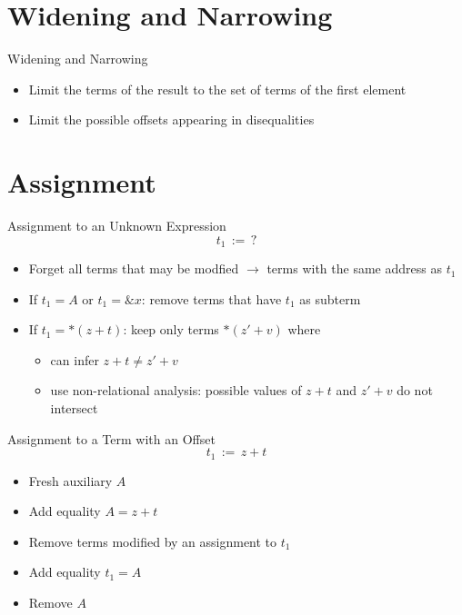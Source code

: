 \documentclass[aspectratio=169]{beamer}
\begin{document}
\section{Widening and Narrowing}
\begin{frame}{Widening and Narrowing}

    \begin{itemize}
        \item Limit the terms of the result to the set of terms of the first element
    \end{itemize}
    \begin{itemize}
\pause
        \item Limit the possible offsets
              appearing in disequalities
    \end{itemize}

\end{frame}

\section{Assignment}

\begin{frame}{Assignment to an Unknown Expression}
    \[
        t_1\,{:=}\,?
    \]
    \begin{itemize}
        \item Forget all terms that may be modfied $\rightarrow$ terms with the same address as $t_1$
        \pause
        \item If $t_1 = A$ or $t_1 = \&x$: remove terms that have $t_1$ as subterm
        \pause
        \item If $t_1 = *(z + t)$: keep only terms $*(z' + v)$ where
              \begin{itemize}
                \item can infer $z + t \neq z' + v$ %
                  \item use non-relational analysis: possible values of $z + t$ and $z' + v$ do not intersect
              \end{itemize}
    \end{itemize}
\end{frame}

\begin{frame}{Assignment to a Term with an Offset}
    \[
        t_1\,{:=}\,z + t
    \]
    \begin{itemize}
        \item Fresh auxiliary $A$
        \item Add equality $A = z + t$
        \item Remove terms modified by an assignment to $t_1$
        \item Add equality $t_1 = A$
        \item Remove $A$
    \end{itemize}
\end{frame}
\end{document}
